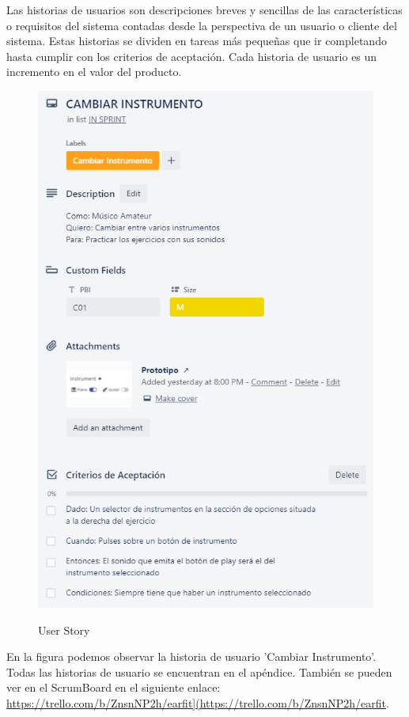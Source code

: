 \documentclass[12pt,twoside,titlepage]{report}
\begin{document}
Las historias de usuarios son descripciones breves y sencillas de las características o requisitos del sistema contadas desde la perspectiva de un usuario o cliente del sistema. Estas historias se dividen en tareas más pequeñas que ir completando hasta cumplir con los criterios de aceptación. Cada historia de usuario es un incremento en el valor del producto.

\begin{figure}[H]
    \centering
    \includegraphics[scale=0.7]{Scrum/UserStory}
    \label{fig:UserStory}
    \caption{User Story}
\end{figure}

En la figura podemos observar la historia de usuario 'Cambiar Instrumento'. Todas las historias de usuario se encuentran en el apéndice. También se pueden ver en el ScrumBoard en el siguiente enlace: \url{https://trello.com/b/ZnsnNP2h/earfit](https://trello.com/b/ZnsnNP2h/earfit}.
\end{document}
